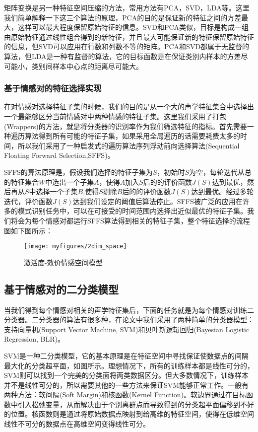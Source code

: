 矩阵变换是另一种特征空间压缩的方法，常用方法有PCA，SVD，LDA等。这里我们简单解释一下这三个算法的原理，PCA的目的是保证新的特征之间的方差最大，这样可以最大程度保留原始特征的信息。SVD和PCA类似，目标是构成一组由原始特征通过线性组合得到的新特征，并且最大可能保证新的特征保留原始特征的信息，但SVD可以应用在行数和列数不等的矩阵。PCA和SVD都属于无监督的算法，但LDA是一种有监督的算法，它的目标函数是在保证类别内样本的方差尽可能小，类别间样本中心点的距离尽可能大。
 
\subsubsection{基于情感对的特征选择实现}
在对情感对选择特征子集的时候，我们的目的是从一个大的声学特征集合中选择出一个最能够区分当前情感对中两种情感的特征子集。这里我们采用了打包(Wrappers)的方法，就是将分类器的识别率作为我们筛选特征的指标。首先需要一种遍历算法得到所有可能的特征子集，如果采用全局遍历的话需要耗费太多的时间，所以我们采用了一种启发式的遍历算法序列浮动前向选择算法(Sequential Floating Forward Selection,SFFS)。

SFFS的算法原理是，假设我们选择的特征子集为$S$，初始时$S$为空，每轮迭代从总的特征集合$W$中选出一个子集$A$，使得$A$加入$S$后的的评价函数$J(S)$达到最优，然后再从$S$中选择一个子集$B$,使得$S$剔除$B$后的的评价函数$J(S)$达到最优。经过多轮迭代，评价函数$J(S)$达到我们设定的阈值后算法停止。SFFS被广泛的应用在许多的模式识别任务中，可以在可接受的时间范围内选择出近似最优的特征子集。我们将会为每个情感对都运行SFFS算法得到相关的特征子集，整个特征选择的流程图如下图所示：

\begin{figure}[H] %
    \centering
    \texttt{[image: myfigures/2dim\_space]}
    \caption{激活度-效价情感空间模型}
    \label{fig:xfig1}
\end{figure}

\subsection{基于情感对的二分类模型}

当我们得到每个情感对相关的声学特征集后，下面的任务就是为每个情感对训练二分类器。二分类器的算法有很多种，在论文中我们采用了两种简单的分类器模型：支持向量机(Support Vector Machine, SVM)和贝叶斯逻辑回归(Bayesian Logistic Regression, BLR)。

SVM是一种二分类模型，它的基本原理是在特征空间中寻找保证使数据点的间隔最大化的分类超平面，如图所示。理想情况下，所有的训练样本都是线性可分的，SVM则可以找到一个完美的分类面将两类数据区分。但大多数情况下，训练样本并不是线性可分的，所以需要其他的一些方法来保证SVM能够正常工作。一般有两种方法：软间隔(Soft Margin)和核函数(Kernel Function)。软边界通过在目标函数中引入松弛变量，从而解决由于个别离群点而导致得到的分类超平面偏移到不好的位置。核函数则是通过将原始数据点映射到给高维的特征空间，使得在低维空间线性不可分的数据点在高维空间变得线性可分。

